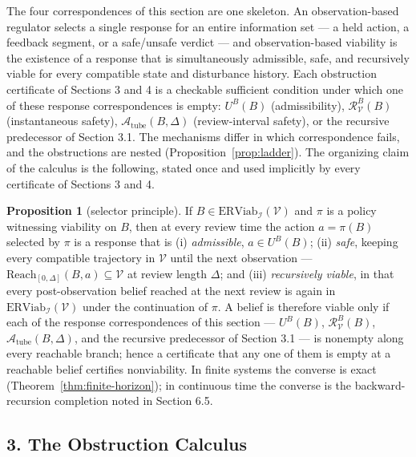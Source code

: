 \documentclass[10pt,twocolumn]{article}
\theoremstyle{definition}
\newtheorem{proposition}{Proposition}
\begin{document}
The four correspondences of this section are one skeleton. An
observation-based regulator selects a single response for an entire
information set --- a held action, a feedback segment, or a
safe/unsafe verdict --- and observation-based viability is the existence
of a response that is simultaneously admissible, safe, and recursively
viable for every compatible state and disturbance history. Each
obstruction certificate of Sections 3 and 4 is a checkable sufficient
condition under which one of these response correspondences is empty:
\(U^B(B)\) (admissibility), \(\mathcal{R}_{\mathcal{V}}^B(B)\)
(instantaneous safety), \(\mathcal{A}_{\mathrm{tube}}(B,\Delta)\)
(review-interval safety), or the recursive predecessor of Section 3.1.
The mechanisms differ in which correspondence fails, and the
obstructions are nested (Proposition~\ref{prop:ladder}). The organizing
claim of the calculus is the following, stated once and used implicitly
by every certificate of Sections 3 and 4.

\begin{proposition}[selector principle]\label{prop:selector}
If \(B\in\mathrm{ERViab}_{\mathcal{I}}(\mathcal{V})\) and \(\pi\) is a
policy witnessing viability on \(B\), then at every review time the
action \(a=\pi(B)\) selected by \(\pi\) is a response that is
(i) \emph{admissible}, \(a\in U^B(B)\); (ii) \emph{safe}, keeping every
compatible trajectory in \(\mathcal{V}\) until the next observation ---
\(\mathrm{Reach}_{[0,\Delta]}(B,a)\subseteq\mathcal{V}\) at review
length \(\Delta\); and (iii) \emph{recursively viable}, in that every
post-observation belief reached at the next review is again in
\(\mathrm{ERViab}_{\mathcal{I}}(\mathcal{V})\) under the continuation
of \(\pi\). A belief is therefore viable only if each of the response
correspondences of this section --- \(U^B(B)\),
\(\mathcal{R}_{\mathcal{V}}^B(B)\), \(\mathcal{A}_{\mathrm{tube}}(B,\Delta)\),
and the recursive predecessor of Section 3.1 --- is nonempty along
every reachable branch; hence a certificate that any one of them is
empty at a reachable belief certifies nonviability. In finite systems
the converse is exact (Theorem~\ref{thm:finite-horizon}); in continuous
time the converse is the backward-recursion completion noted in
Section 6.5.
\end{proposition}



\subsection{3. The Obstruction Calculus}\label{the-obstruction-calculus}
\end{document}
